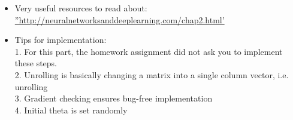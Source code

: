 \documentclass[12pt]{article}
\begin{document}
\begin{itemize}
\begin{itemize}
		\item Very useful resources to read about:\\
		\hyperref[http://neuralnetworksanddeeplearning.com/chap2.html]{''http://neuralnetworksanddeeplearning.com/chap2.html'}
		\item Tips for implementation:\\
		1. For this part, the homework assignment did not ask you to implement these steps.\\
		2. Unrolling is basically changing a matrix into a single column vector, i.e. unrolling\\
		3. Gradient checking ensures bug-free implementation\\
		4. Initial theta is set randomly
		
	\end{itemize}
		
	\end{itemize}
\end{document}
